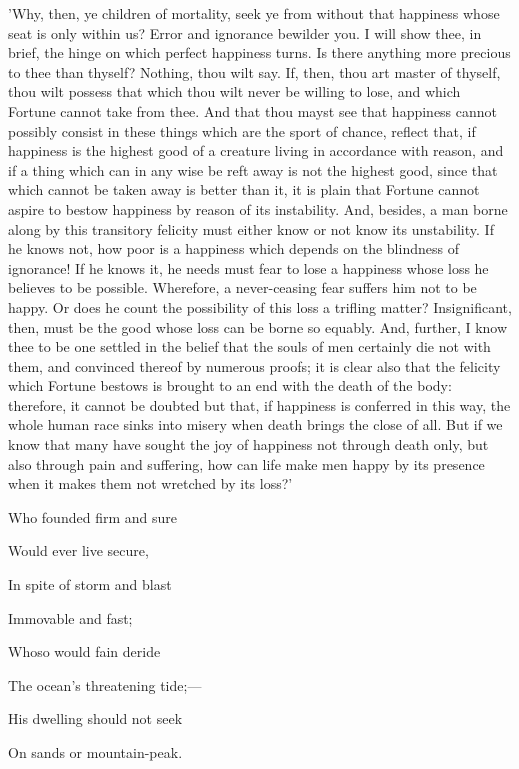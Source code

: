 'Why, then, ye children of mortality, seek ye from without that
happiness whose seat is only within us? Error and ignorance bewilder
you. I will show thee, in brief, the hinge on which perfect happiness
turns. Is there anything more precious to thee than thyself? Nothing,
thou wilt say. If, then, thou art master of thyself, thou wilt possess
that which thou wilt never be willing to lose, and which Fortune cannot
take from thee. And that thou mayst see that happiness cannot possibly
consist in these things which are the sport of chance, reflect that, if
happiness is the highest good of a creature living in accordance with
reason, and if a thing which can in any wise be reft away is not the
highest good, since that which cannot be taken away is better than it,
it is plain that Fortune cannot aspire to bestow happiness by reason of
its instability. And, besides, a man borne along by this transitory
felicity must either know or not know its unstability. If he knows not,
how poor is a happiness which depends on the blindness of ignorance! If
he knows it, he needs must fear to lose a happiness whose loss he
believes to be possible. Wherefore, a never-ceasing fear suffers him not
to be happy. Or does he count the possibility of this loss a trifling
matter? Insignificant, then, must be the good whose loss can be borne so
equably. And, further, I know thee to be one settled in the belief that
the souls of men certainly die not with them, and convinced thereof by
numerous proofs; it is clear also that the felicity which Fortune
bestows is brought to an end with the death of the body: therefore, it
cannot be doubted but that, if happiness is conferred in this way, the
whole human race sinks into misery when death brings the close of all.
But if we know that many have sought the joy of happiness not through
death only, but also through pain and suffering, how can life make men
happy by its presence when it makes them not wretched by its loss?'


Who founded firm and sure

Would ever live secure,

In spite of storm and blast

Immovable and fast;

Whoso would fain deride

The ocean's threatening tide;—

His dwelling should not seek

On sands or mountain-peak.

